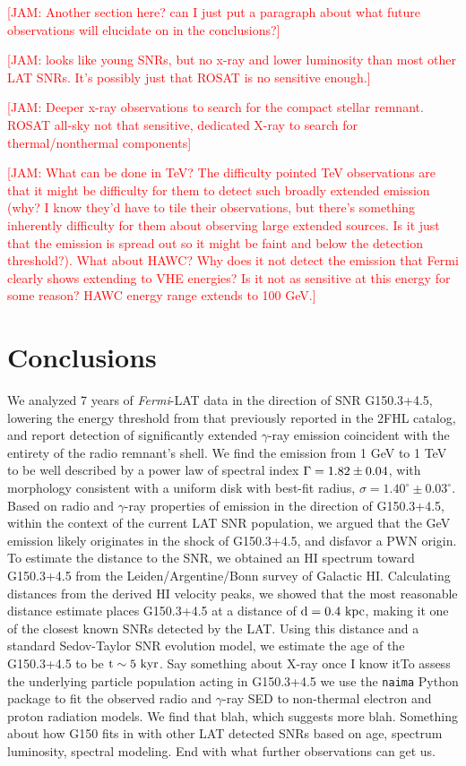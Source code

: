 \documentclass[iop]{emulateapj}
\newcommand{\kibitz}[2]{\ifnum\Comments=1\textcolor{#1}{#2}\fi}
\newcommand{\jamie}[1]{\kibitz{red}      {[JAM: #1]}}
\newcommand{\gam}{$\gamma$-ray}
\newcommand{\FermiLat}{\emph{Fermi}-LAT }     %
\newcommand{\nai}{{\tt naima}}
\newcommand{\Gone}{G150.3+4.5}
\begin{document}
\jamie{Another section here? can I just put a paragraph about what future observations will  elucidate on in the conclusions?}

\jamie{looks like young SNRs, but no x-ray and lower luminosity than most other LAT SNRs. It's possibly just that ROSAT is no sensitive enough.}

\jamie{Deeper x-ray observations to search for the compact stellar remnant. ROSAT all-sky not that sensitive, dedicated X-ray to search for thermal/nonthermal components}

\jamie{What can be done in TeV? The difficulty pointed TeV observations are that it might be difficulty for them to detect such broadly extended emission (why? I know they'd have to tile their observations, but there's something inherently difficulty for them about observing large extended sources. Is it just that the emission is spread out so it might be faint and below the detection threshold?). What about HAWC? Why does it not detect the emission that Fermi clearly shows extending to VHE energies? Is it not as sensitive at this energy for some reason? HAWC energy range extends to 100 GeV.}


%
%
\section{Conclusions}\label{sec:Conc}
We analyzed 7 years of \FermiLat{} data in the direction of SNR \Gone{}, lowering the energy threshold from that previously reported in the 2FHL catalog, and report detection of significantly extended \gam{} emission coincident with the entirety of the radio remnant's shell. We find the emission from 1 GeV to 1 TeV to be well described by a power law of spectral index ${\Gamma = \rm 1.82 \pm 0.04}$, with  morphology consistent with a uniform disk with best-fit radius, {\rm $\sigma = 1.40^{\circ} \pm 0.03^{\circ}$}.  Based on radio and  \gam{} properties of emission in the direction of \Gone{}, within the context of the current LAT SNR population, we argued that the GeV emission likely originates in the shock of \Gone{}, and disfavor a PWN origin. To estimate the distance to the SNR, we obtained  an HI spectrum toward \Gone{} from the Leiden/Argentine/Bonn survey of Galactic HI. Calculating distances from the derived HI velocity peaks, we showed that the most reasonable distance estimate places \Gone{} at a distance of ${\rm d = 0.4~kpc}$, making it one of the closest known SNRs detected by the LAT. Using this distance and a standard Sedov-Taylor SNR evolution model, we estimate the age of the \Gone{} to be ${\rm t \sim 5~kyr}$. Say something about X-ray once I know itTo assess the underlying particle population acting in \Gone{} we use the \nai{} Python package to fit the observed radio and \gam{} SED to non-thermal electron and proton radiation models. We find that blah, which suggests more blah. Something about how G150  fits in with other LAT detected SNRs based on age, spectrum luminosity, spectral modeling. End with what  further observations can get us.
\end{document}

